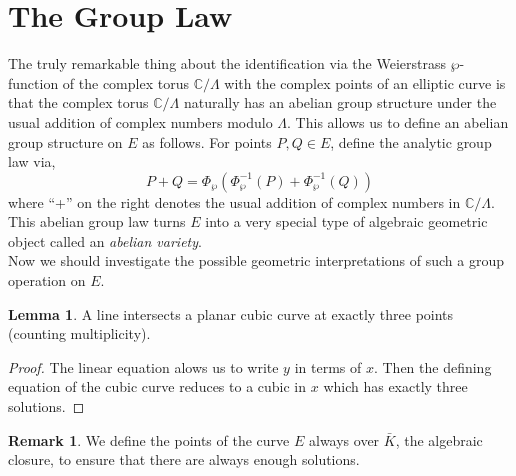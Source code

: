 \documentclass{article}
\newcommand{\C}{\mathbb{C}}
\theoremstyle{definition}
\newtheorem{lemma}[theorem]{Lemma}
\newtheorem{remark}{Remark}[section]
\begin{document}
\section{The Group Law}

The truly remarkable thing about the identification via the Weierstrass $\wp$-function of the complex torus $\C / \Lambda$ with the complex points of an elliptic curve is that the complex torus $\C / \Lambda$ naturally has an abelian group structure under the usual addition of complex numbers modulo $\Lambda$. This allows us to define an abelian group structure on $E$ as follows. For points $P, Q \in E$, define the analytic group law via,
\[ P + Q = \Phi_{\wp}(\Phi^{-1}_{\wp}(P) + \Phi^{-1}_{\wp}(Q)) \]
where ``+'' on the right denotes the usual addition of complex numbers in $\C / \Lambda$. This abelian group law turns $E$ into a very special type of algebraic geometric object called an \textit{abelian variety}. 
\bigskip\\
Now we should investigate the possible geometric interpretations of such a group operation on $E$.

\begin{lemma}
A line intersects a planar cubic curve at exactly three points (counting multiplicity). 
\end{lemma}

\begin{proof}
The linear equation alows us to write $y$ in terms of $x$. Then the defining equation of the cubic curve reduces to a cubic in $x$ which has exactly three solutions. 
\end{proof}

\begin{remark} 
We define the points of the curve $E$ always over $\bar{K}$, the algebraic closure, to ensure that there are always enough solutions.
\end{remark}
\end{document}

